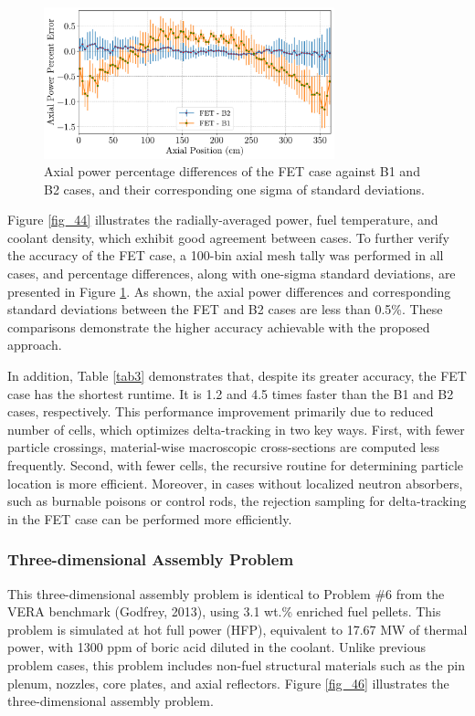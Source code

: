 \begin{figure}
    \centering
    \includegraphics[width=0.75\textwidth]{figs/axial_diff.pdf}
    \caption[Axial power percentage differences of the FET case]{Axial power percentage differences of the FET case against B1 and B2 cases, and their corresponding one sigma of standard deviations.}
    \label{fig_45}
\end{figure}

Figure \ref{fig_44} illustrates the radially-averaged power, fuel temperature, and coolant density, which exhibit good agreement between cases. To further verify the accuracy of the FET case, a 100-bin axial mesh tally was performed in all cases, and percentage differences, along with one-sigma standard deviations, are presented in Figure \ref{fig_45}. As shown, the axial power differences and corresponding standard deviations between the FET and B2 cases are less than 0.5\%. These comparisons demonstrate the higher accuracy achievable with the proposed approach.

In addition, Table \ref{tab3} demonstrates that, despite its greater accuracy, the FET case has the shortest runtime. It is 1.2 and 4.5 times faster than the B1 and B2 cases, respectively. This performance improvement primarily due to reduced number of cells, which optimizes delta-tracking in two key ways. First, with fewer particle crossings, material-wise macroscopic cross-sections are computed less frequently. Second, with fewer cells, the recursive routine for determining particle location is more efficient. Moreover, in cases without localized neutron absorbers, such as burnable poisons or control rods, the rejection sampling for delta-tracking in the FET case can be performed more efficiently.

\subsubsection{Three-dimensional Assembly Problem} \label{3d_asm}

This three-dimensional assembly problem is identical to Problem \#6 from the VERA benchmark (Godfrey, 2013), using 3.1 wt.\% enriched fuel pellets. This problem is simulated at hot full power (HFP), equivalent to 17.67 MW of thermal power, with 1300 ppm of boric acid diluted in the coolant. Unlike previous problem cases, this problem includes non-fuel structural materials such as the pin plenum, nozzles, core plates, and axial reflectors. Figure \ref{fig_46} illustrates the three-dimensional assembly problem.

